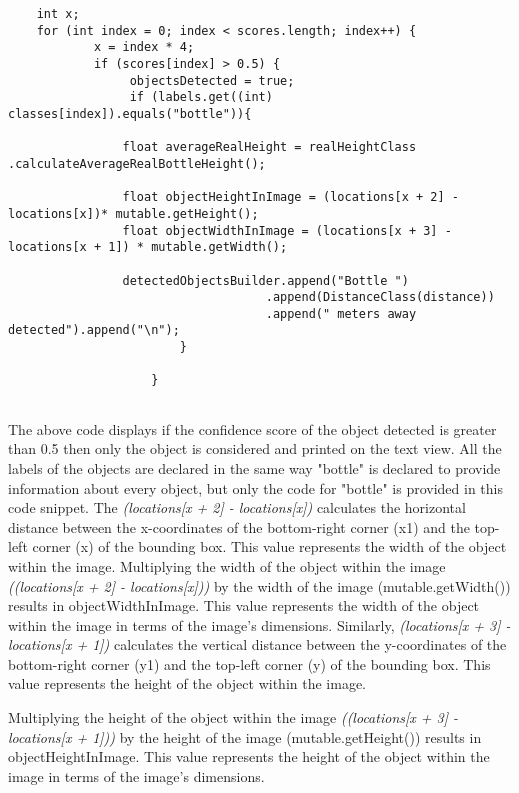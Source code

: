 \documentclass[MScCS]{uccthesis}
\begin{document}
\begin{scriptsize}
    \begin{verbatim}
    int x;
    for (int index = 0; index < scores.length; index++) {
            x = index * 4;
            if (scores[index] > 0.5) {
                 objectsDetected = true;
                 if (labels.get((int) classes[index]).equals("bottle")){

                float averageRealHeight = realHeightClass .calculateAverageRealBottleHeight();

                float objectHeightInImage = (locations[x + 2] - locations[x])* mutable.getHeight();
                float objectWidthInImage = (locations[x + 3] - locations[x + 1]) * mutable.getWidth();
                                    
                detectedObjectsBuilder.append("Bottle ")
                                    .append(DistanceClass(distance))
                                    .append(" meters away detected").append("\n");               
                        }
            
                    }                    
                                
    \end{verbatim}
\end{scriptsize}
The above code displays if the confidence score of the object detected is greater than 0.5 then only the object is considered and printed on the text view. All the labels of the objects are declared in the same way "bottle" is declared to provide information about every object, but only the code for "bottle" is provided in this code snippet. The \textit{(locations[x + 2] - locations[x])} calculates the horizontal distance between the x-coordinates of the bottom-right corner (x1) and the top-left corner (x) of the bounding box. This value represents the width of the object within the image. Multiplying the width of the object within the image \textit{((locations[x + 2] - locations[x]))} by the width of the image (mutable.getWidth()) results in objectWidthInImage. This value represents the width of the object within the image in terms of the image's dimensions. Similarly, \textit{(locations[x + 3] - locations[x + 1])} calculates the vertical distance between the y-coordinates of the bottom-right corner (y1) and the top-left corner (y) of the bounding box. This value represents the height of the object within the image.

Multiplying the height of the object within the image \textit{((locations[x + 3] - locations[x + 1]))} by the height of the image (mutable.getHeight()) results in objectHeightInImage. This value represents the height of the object within the image in terms of the image's dimensions.     
\end{document}
